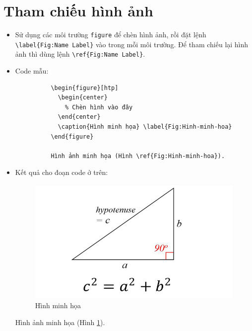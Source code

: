 \documentclass[12pt,a4paper]{article}
\begin{document}
  \section{Tham chiếu hình ảnh}
    \begin{itemize}
      \item Sử dụng các môi trường \verb|figure| để chèn hình ảnh, rồi đặt lệnh \verb|\label{Fig:Name Label}| vào trong mỗi môi trường. Để tham chiếu lại hình ảnh thì dùng lệnh \verb|\ref{Fig:Name Label}|.
      \item Code mẫu:
        \begin{verbatim}
          \begin{figure}[htp]
            \begin{center}
              % Chèn hình vào đây
            \end{center}
            \caption{Hình minh họa} \label{Fig:Hinh-minh-hoa}
          \end{figure}
    
          Hình ảnh minh họa (Hình \ref{Fig:Hinh-minh-hoa}).
        \end{verbatim}
      \item Kết quả cho đoạn code ở trên:
        
      \begin{figure}[!htp]
        \begin{center}
          \includegraphics[scale=0.5]{images/pytago}
        \end{center}
        \caption{Hình minh họa} \label{Fig:Hinh-minh-hoa}
      \end{figure}

      Hình ảnh minh họa (Hình \ref{Fig:Hinh-minh-hoa}).
    \end{itemize}
\end{document}
